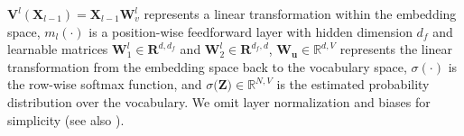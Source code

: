 \begin{definition}
$\bm{V}^l(\bm{X}_{l-1}) = \bm{X}_{l-1}\bm{W}^l_v$ represents a linear transformation within the embedding space, $m_l(\cdot)$ is a position-wise feedforward layer with hidden dimension $d_f$ and learnable matrices $\bm{W}^l_1 \in \mathbf{R}^{d,d_f}$ and $\bm{W}^l_2\in \mathbf{R}^{d_f,d}$, $\bm{W_u}\in \mathbb{R}^{d, V}$ represents the linear transformation from the embedding space back to the vocabulary space, $\sigma(\cdot)$ is the row-wise softmax function,  and $\sigma\big(\bm{Z}\big)\in \mathbb{R}^{N,V}$ is the estimated probability distribution over the vocabulary.
%
We omit layer normalization and biases for simplicity (see also \citep{elhageMathematicalFrameworkTransformer2021}).
%
\end{definition}
%